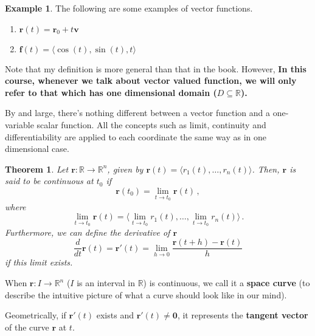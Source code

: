 \documentclass[
]{book}
\newtheorem{theorem}{Theorem}[chapter]
\theoremstyle{definition}
\theoremstyle{definition}
\newtheorem{example}{Example}[chapter]
\theoremstyle{definition}
\theoremstyle{definition}
\theoremstyle{remark}
\begin{document}
\begin{example}

The following are some examples of vector functions.

\begin{enumerate}
\def\labelenumi{\arabic{enumi}.}
\item
  \(\mathbf{r}(t) = \mathbf{r}_0 + t\mathbf{v}\)
\item
  \(\mathbf{f}(t) = \langle \cos(t),\sin(t), t \rangle\)
\end{enumerate}

\end{example}

Note that my definition is more general than that in the book.
However,
\textbf{In this course, whenever we talk about vector valued function, we will only refer to
that which has one dimensional domain (\(D \subseteq \mathbb{R}\)).}

By and large, there's nothing different between a vector function and
a one-variable scalar function.
All the concepts such as limit, continuity and differentiability are applied
to each coordinate the same way as in one dimensional case.

\begin{theorem}
Let \(\mathbf{r}: \mathbb{R}\to \mathbb{R}^n\), given by \(\mathbf{r}(t) = \langle r_1(t), \dots , r_n(t) \rangle\).
Then, \(\mathbf{r}\) is said to be continuous at \(t_0\) if
\begin{equation*}
    \mathbf{r}(t_0) = \lim_{t\to t_0} \mathbf{r}(t) \,,
\end{equation*}
where
\begin{equation*}
    \lim_{t\to t_0} \mathbf{r}(t) = \langle \lim_{t\to t_0}r_1(t) , \dots , \lim_{t\to t_0} r_n(t) \rangle \,. 
\end{equation*}
Furthermore, we can define the derivative of \(\mathbf{r}\)
\begin{equation*}
    \frac{d}{dt} \mathbf{r}(t) = \mathbf{r}'(t) = \lim_{h\to 0} \frac{\mathbf{r}(t+h) - \mathbf{r}(t)}{h} 
\end{equation*}
if this limit exists.
\end{theorem}

When \(\mathbf{r}:I \to \mathbb{R}^n\) (\(I\) is an interval in \(\mathbb{R}\)) is continuous,
we call it a \textbf{space curve} (to describe the intuitive picture of what
a curve should look like in our mind).

Geometrically, if \(\mathbf{r}'(t)\) exists and \(\mathbf{r}'(t) \not= \mathbf{0}\), it
represents the \textbf{tangent vector} of the curve \(\mathbf{r}\) at \(t\).
\end{document}
